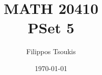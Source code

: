 \documentclass{article}
\newenvironment{problem}[2][Problem]{\begin{trivlist}
\item[\hskip \labelsep {\bfseries #1}\hskip \labelsep {\bfseries #2.}]}{\end{trivlist}}
\begin{document}
\newcommand{\s}[0]{\sin(\theta)}
\newcommand{\cs}[0]{\cos(\theta)}
\newcommand{\spa}[0]{\hspace{1mm}}

\title{MATH 20410 \\ PSet 5} %
\author{Filippos Tsoukis} %
\date{\today}
\maketitle

%
%

\begin{problem}{9.17}
\end{problem}
\end{document}
